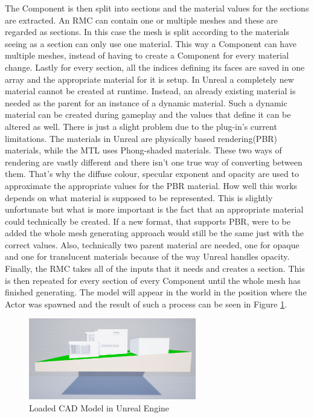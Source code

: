 The Component is then split into sections and the material values for the sections are extracted. An \acs{RMC} can contain one or multiple meshes and these are regarded as sections. In this case the mesh is split according to the materials seeing as a section can only use one material. This way a Component can have multiple meshes, instead of having to create a Component for every material change. Lastly for every section, all the indices defining its faces are saved in one array and the appropriate material for it is setup. In Unreal a completely new material cannot be created at runtime. Instead, an already existing material is needed as the parent for an instance of a dynamic material. Such a dynamic material can be created during gameplay and the values that define it can be altered as well. There is just a slight problem due to the plug-in's current limitations. The materials in Unreal are physically based rendering(\acs{PBR}) materials\cite{bib:UEPBR}, while the MTL uses Phong-shaded materials\cite{bib:MTL}. These two ways of rendering are vastly different and there isn't one true way of converting between them. That's why the diffuse colour, specular exponent and opacity are used to approximate the appropriate values for the \acs{PBR} material. How well this works depends on what material is supposed to be represented. This is slightly unfortunate but what is more important is the fact that an appropriate material could technically be created. If a new format, that supports \acs{PBR}, were to be added the whole mesh generating approach would still be the same just with the correct values. Also, technically two parent material are needed, one for opaque and one for translucent materials because of the way Unreal handles opacity.\\
Finally, the \acs{RMC} takes all of the inputs that it needs and creates a section. This is then repeated for every section of every Component until the whole mesh has finished generating. The model will appear in the world in the position where the Actor was spawned and the result of such a process can be seen in Figure \ref{fig:LoadedModel}.

\begin{figure}[htpb]
	\centering
	\includegraphics[width=0.65\textwidth]{fig/LoadedModel2.png}
	\caption[Loaded CAD Model in Unreal Engine]{Loaded CAD Model in Unreal Engine\protect\footnotemark}
	\label{fig:LoadedModel}
\end{figure}

